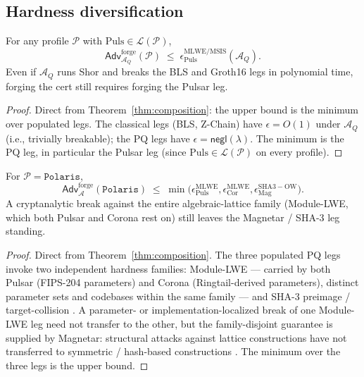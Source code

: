 \subsection{Hardness diversification}

\begin{corollary}
\label{cor:diversification}
For any profile $\mathcal{P}$ with $\mathrm{Puls} \in \mathcal{L}(\mathcal{P})$,
\[
\mathsf{Adv}^{\mathrm{forge}}_{\mathcal{A}_Q}(\mathcal{P})
\;\leq\;
\epsilon_{\mathrm{Puls}}^{\mathrm{MLWE/MSIS}}(\mathcal{A}_Q).
\]
Even if $\mathcal{A}_Q$ runs Shor and breaks the BLS and Groth16 legs
in polynomial time, forging the cert still requires forging the
Pulsar leg.
\end{corollary}

\begin{proof}
Direct from Theorem~\ref{thm:composition}: the upper bound is the
minimum over populated legs. The classical legs (BLS, Z-Chain) have
$\epsilon = O(1)$ under $\mathcal{A}_Q$ (i.e., trivially breakable);
the PQ legs have $\epsilon = \mathsf{negl}(\lambda)$. The minimum is
the PQ leg, in particular the Pulsar leg (since $\mathrm{Puls} \in
\mathcal{L}(\mathcal{P})$ on every profile).
\end{proof}

\begin{corollary}
\label{cor:polaris}
For $\mathcal{P} = \texttt{Polaris}$,
\[
\mathsf{Adv}^{\mathrm{forge}}_{\mathcal{A}}(\texttt{Polaris})
\;\leq\;
\min\bigl(\epsilon_{\mathrm{Puls}}^{\mathrm{MLWE}}, \epsilon_{\mathrm{Cor}}^{\mathrm{MLWE}},
\epsilon_{\mathrm{Mag}}^{\mathrm{SHA3-OW}}\bigr).
\]
A cryptanalytic break against the entire algebraic-lattice family
(Module-LWE, which both Pulsar and Corona rest on) still leaves the
Magnetar / SHA-3 leg standing.
\end{corollary}

\begin{proof}
Direct from Theorem~\ref{thm:composition}. The three populated PQ
legs invoke two independent hardness families: Module-LWE
\cite{fips204,dilithium,regev2009,mlwe,ringtail} --- carried by both
Pulsar (FIPS-204 parameters) and Corona (Ringtail-derived
parameters), distinct parameter sets and codebases within the same
family --- and SHA-3 preimage / target-collision \cite{fips205,
sphincs}. A parameter- or implementation-localized break of one
Module-LWE leg need not transfer to the other, but the family-disjoint
guarantee is supplied by Magnetar: structural attacks against
lattice constructions have not transferred to symmetric / hash-based
constructions \cite{albrechtestimator,bdgl2016}. The minimum over
the three legs is the upper bound.
\end{proof}

